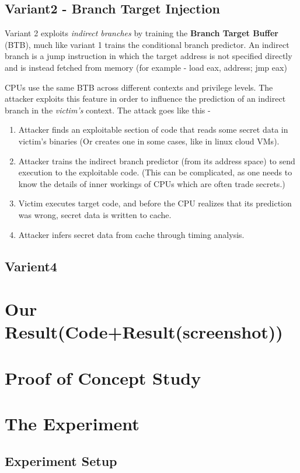 \documentclass[12pt]{article}
\begin{document}
\subsection{Variant2 - Branch Target Injection}
Variant 2 exploits \textit{indirect branches} by training the \textbf{Branch Target Buffer} (BTB), much like variant 1 trains the conditional branch predictor. An indirect branch is a jump instruction in which the target address is not specified directly and is instead fetched from memory (for example - load eax, address; jmp eax)

CPUs use the same BTB across different contexts and privilege levels. The attacker exploits this feature in order to influence the prediction of an indirect branch in the \textit{victim's} context. The attack goes like this - 
 \begin{enumerate}
 \item Attacker finds an exploitable section of code that reads some secret data in victim's binaries (Or creates one in some cases, like in linux cloud VMs).
 \item Attacker trains the indirect branch predictor (from its address space) to send execution to the exploitable code. (This can be complicated, as one needs to know the details of inner workings of CPUs which are often trade secrets.)
 \item Victim executes target code, and before the CPU realizes that its prediction was wrong, secret data is written to cache.
 \item Attacker infers secret data from cache through timing analysis.
 \end{enumerate}
\subsection{Varient4}
\section{Our Result(Code+Result(screenshot))}
\section{Proof of Concept Study}
\section{The Experiment\cite{SeedLabs}}
\subsection{Experiment Setup}
\end{document}

